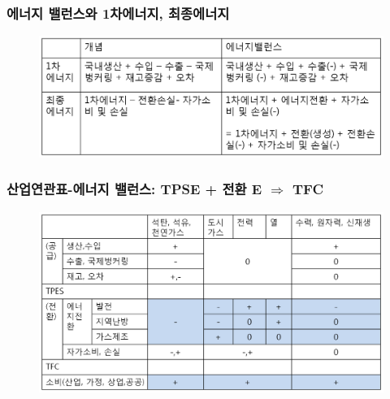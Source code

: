 \documentclass[10pt,compress,slidetop,%
			   hyperref={unicode},xcolor={svgnames},%
			   t]{beamer}
\begin{document}
\begin{frame}
	\frametitle{에너지 밸런스와 1차에너지, 최종에너지}
	  	\begin{figure}
	\centering
	 \includegraphics[width=1.00\textwidth]{Definition.png}
	\label{IEA world balance}
	\end{figure}	
	
\end{frame}

\begin{frame}
	\frametitle{산업연관표-에너지 밸런스: TPSE + 전환 E $\Rightarrow$ TFC}
	  	\begin{figure}
	\centering
	 \includegraphics[width=1.00\textwidth]{EBKtarget.png}
	\label{IEA world balance}
	\end{figure}	
	
\end{frame}


% 
\end{document}
